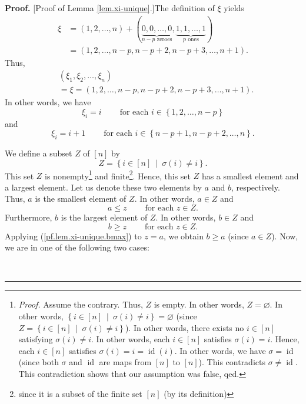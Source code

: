 \documentclass
[numbers=enddot,12pt,final,onecolumn,notitlepage,english]{scrartcl}%
\theoremstyle{definition}
\newenvironment{proof}[1][Proof]{\noindent\textbf{#1.} }{\ \rule{0.5em}{0.5em}}
\newenvironment{verlong}{}{}
\begin{document}
\begin{verlong}
\begin{proof}
[Proof of Lemma \ref{lem.xi-unique}.]The definition of $\xi$ yields%
\begin{align*}
\xi &  =\left(  1,2,\ldots,n\right)  +\left(  \underbrace{0,0,\ldots
,0}_{n-p\text{ zeroes}},\underbrace{1,1,\ldots,1}_{p\text{ ones}}\right) \\
&  =\left(  1,2,\ldots,n-p,n-p+2,n-p+3,\ldots,n+1\right)  .
\end{align*}
Thus,%
\begin{align}
&  \left(  \xi_{1},\xi_{2},\ldots,\xi_{n}\right) \nonumber\\
&  =\xi=\left(  1,2,\ldots,n-p,n-p+2,n-p+3,\ldots,n+1\right)  .
\label{pf.lem.xi-unique.xi=2}%
\end{align}
In other words, we have%
\begin{equation}
\xi_{i}=i\ \ \ \ \ \ \ \ \ \ \text{for each }i\in\left\{  1,2,\ldots
,n-p\right\}  \label{pf.lem.xi-unique.xii=}%
\end{equation}
and%
\begin{equation}
\xi_{i}=i+1\ \ \ \ \ \ \ \ \ \ \text{for each }i\in\left\{  n-p+1,n-p+2,\ldots
,n\right\}  . \label{pf.lem.xi-unique.xin=}%
\end{equation}


We define a subset $Z$ of $\left[  n\right]  $ by%
\[
Z=\left\{  i\in\left[  n\right]  \ \mid\ \sigma\left(  i\right)  \neq
i\right\}  .
\]
This set $Z$ is nonempty\footnote{\textit{Proof.} Assume the contrary. Thus,
$Z$ is empty. In other words, $Z=\varnothing$. In other words, $\left\{
i\in\left[  n\right]  \ \mid\ \sigma\left(  i\right)  \neq i\right\}
=\varnothing$ (since $Z=\left\{  i\in\left[  n\right]  \ \mid\ \sigma\left(
i\right)  \neq i\right\}  $). In other words, there exists no $i\in\left[
n\right]  $ satisfying $\sigma\left(  i\right)  \neq i$. In other words, each
$i\in\left[  n\right]  $ satisfies $\sigma\left(  i\right)  =i$. Hence, each
$i\in\left[  n\right]  $ satisfies $\sigma\left(  i\right)
=i=\operatorname*{id}\left(  i\right)  $. In other words, we have
$\sigma=\operatorname*{id}$ (since both $\sigma$ and $\operatorname*{id}$ are
maps from $\left[  n\right]  $ to $\left[  n\right]  $). This contradicts
$\sigma\neq\operatorname*{id}$. This contradiction shows that our assumption
was false, qed.} and finite\footnote{since it is a subset of the finite set
$\left[  n\right]  $ (by its definition)}. Hence, this set $Z$ has a smallest
element and a largest element. Let us denote these two elements by $a$ and
$b$, respectively. Thus, $a$ is the smallest element of $Z$. In other words,
$a\in Z$ and%
\begin{equation}
a\leq z\ \ \ \ \ \ \ \ \ \ \text{for each }z\in Z.
\label{pf.lem.xi-unique.amin}%
\end{equation}
Furthermore, $b$ is the largest element of $Z$. In other words, $b\in Z$ and%
\begin{equation}
b\geq z\ \ \ \ \ \ \ \ \ \ \text{for each }z\in Z.
\label{pf.lem.xi-unique.bmax}%
\end{equation}
Applying (\ref{pf.lem.xi-unique.bmax}) to $z=a$, we obtain $b\geq a$ (since
$a\in Z$). Now, we are in one of the following two cases:


\end{proof}
\end{verlong}
\end{document}

